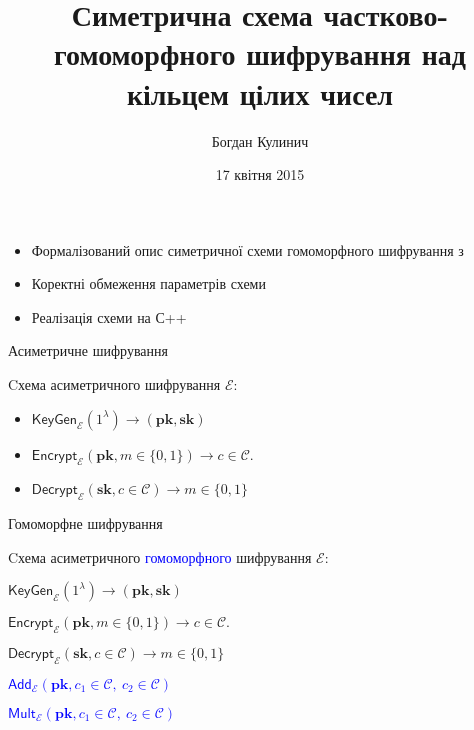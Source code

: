 \documentclass[pdf]{beamer}
\title{Симетрична схема частково-гомоморфного шифрування над кільцем цілих чисел}
\date[2015]{17 квітня 2015}
\author{Богдан Кулинич}
\begin{document}
\begin{frame}
\titlepage
\end{frame}


\begin{frame}{}

\begin{itemize}
	
	\item Формалізований опис симетричної схеми гомоморфного шифрування з \cite{YKPB13}
	\item Коректні обмеження параметрів схеми
	\item Реалізація схеми на С++
	
\end{itemize}

\end{frame}


\begin{frame}{Асиметричне шифрування}

Cхема асиметричного шифрування \( \mathcal{E} \):

\begin{itemize}
	
	\item \( \mathsf{KeyGen}_\mathcal{E}( 1^\lambda ) \rightarrow ( \mathbf{pk}, \mathbf{sk} ) \)
	\item \( \mathsf{Encrypt}_\mathcal{E}( \mathbf{pk}, m \in \{0, 1\} ) \rightarrow c \in \mathcal{C}. \)
	\item \( \mathsf{Decrypt}_\mathcal{E}( \mathbf{sk}, c \in \mathcal{C} ) \rightarrow m \in \{ 0, 1 \} \)
	
\end{itemize}

\end{frame}


\begin{frame}{Гомоморфне шифрування}

Cхема асиметричного \textcolor{blue}{гомоморфного} шифрування \( \mathcal{E} \):

\begin{itemize}
	
	\item \( \mathsf{KeyGen}_\mathcal{E}( 1^\lambda ) \rightarrow ( \mathbf{pk}, \mathbf{sk} ) \)
	\item \( \mathsf{Encrypt}_\mathcal{E}( \mathbf{pk}, m \in \{0, 1\} ) \rightarrow c \in \mathcal{C}. \)
	\item \( \mathsf{Decrypt}_\mathcal{E}( \mathbf{sk}, c \in \mathcal{C} ) \rightarrow m \in \{ 0, 1 \} \)
	\textcolor{blue}{
	\item \( \mathsf{Add}_\mathcal{E}( \mathbf{pk} , c_1 \in \mathcal{C}, ~ c_2 \in \mathcal{C} ) \)
	\item \( \mathsf{Mult}_\mathcal{E}( \mathbf{pk} , c_1 \in \mathcal{C}, ~ c_2 \in \mathcal{C} ) \)}
	
\end{itemize}
\end{frame}
\end{document}
